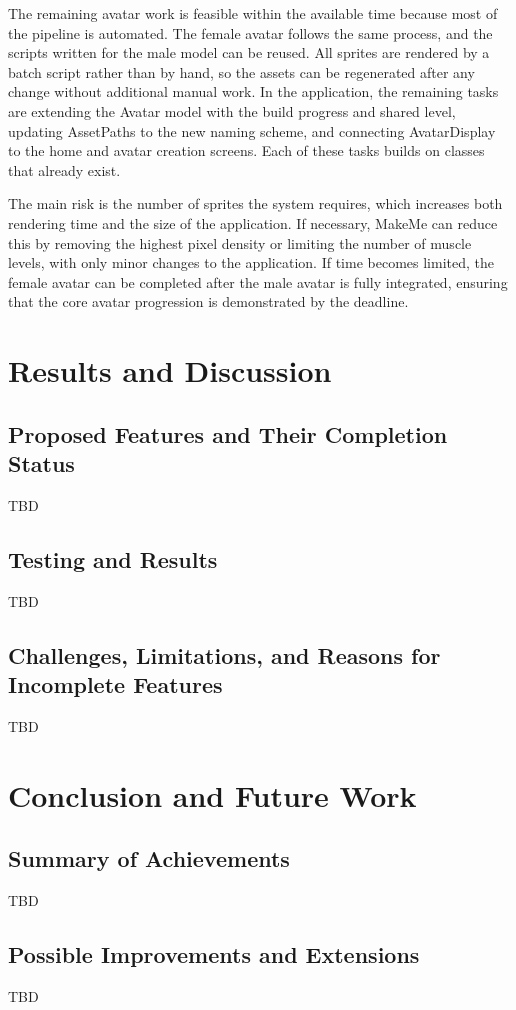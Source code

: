 \documentclass[11pt]{article}
\begin{document}
The remaining avatar work is feasible within the available time because most of the pipeline is automated. The female avatar follows the same process, and the scripts written for the male model can be reused. All sprites are rendered by a batch script rather than by hand, so the assets can be regenerated after any change without additional manual work. In the application, the remaining tasks are extending the Avatar model with the build progress and shared level, updating AssetPaths to the new naming scheme, and connecting AvatarDisplay to the home and avatar creation screens. Each of these tasks builds on classes that already exist.

The main risk is the number of sprites the system requires, which increases both rendering time and the size of the application. If necessary, MakeMe can reduce this by removing the highest pixel density or limiting the number of muscle levels, with only minor changes to the application. If time becomes limited, the female avatar can be completed after the male avatar is fully integrated, ensuring that the core avatar progression is demonstrated by the deadline.


\section{Results and Discussion}

\subsection{Proposed Features and Their Completion Status}
TBD

\subsection{Testing and Results}
TBD

\subsection{Challenges, Limitations, and Reasons for Incomplete Features}
TBD





\section{Conclusion and Future Work}
\subsection{Summary of Achievements}
TBD

\subsection{Possible Improvements and Extensions}
TBD



\clearpage
\printbibliography[heading=bibnumbered, title={References}]
\clearpage
\end{document}
